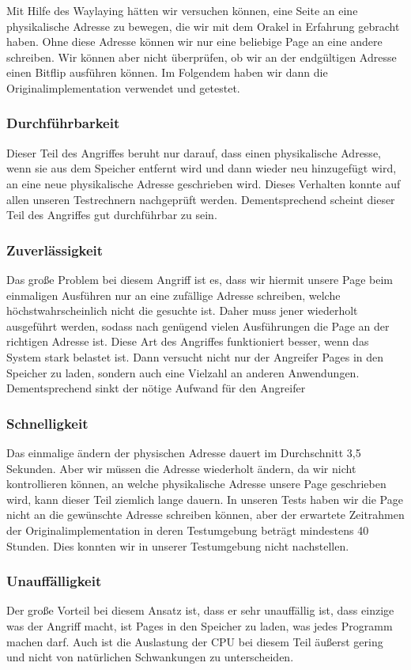 Mit Hilfe des Waylaying hätten wir versuchen können, eine Seite an eine physikalische Adresse zu bewegen, die wir mit dem Orakel in Erfahrung gebracht haben. Ohne diese Adresse können wir nur eine beliebige Page an eine andere schreiben. Wir können aber nicht überprüfen, ob wir an der endgültigen Adresse einen Bitflip ausführen können. Im Folgendem haben wir dann die Originalimplementation\cite{git-rowhammer} verwendet und getestet.

\subsubsection{Durchführbarkeit}
Dieser Teil des Angriffes beruht nur darauf, dass einen physikalische Adresse, wenn sie aus dem Speicher entfernt wird und dann wieder neu hinzugefügt wird, an eine neue physikalische Adresse geschrieben wird. Dieses Verhalten konnte auf allen unseren Testrechnern nachgeprüft werden. Dementsprechend scheint dieser Teil des Angriffes gut durchführbar zu sein.
\subsubsection{Zuverlässigkeit}
Das große Problem bei diesem Angriff ist es, dass wir hiermit unsere Page beim einmaligen Ausführen nur an eine zufällige Adresse schreiben, welche höchstwahrscheinlich nicht die gesuchte ist. Daher muss jener wiederholt ausgeführt werden, sodass nach genügend vielen Ausführungen die Page an der richtigen Adresse ist. 
Diese Art des Angriffes funktioniert besser, wenn das System stark belastet ist. Dann versucht nicht nur der Angreifer Pages in den Speicher zu laden, sondern auch eine Vielzahl an anderen Anwendungen. Dementsprechend sinkt der nötige Aufwand für den Angreifer
\subsubsection{Schnelligkeit}
Das einmalige ändern der physischen Adresse dauert im Durchschnitt 3,5 Sekunden. Aber wir müssen die Adresse wiederholt ändern, da wir nicht kontrollieren können, an welche physikalische Adresse unsere Page geschrieben wird, kann dieser Teil ziemlich lange dauern. In unseren Tests haben wir die Page nicht an die gewünschte Adresse schreiben können, aber der erwartete Zeitrahmen der Originalimplementation in deren Testumgebung beträgt mindestens 40 Stunden. Dies konnten wir in unserer Testumgebung nicht nachstellen.
\subsubsection{Unauffälligkeit}
Der große Vorteil bei diesem Ansatz ist, dass er sehr unauffällig ist, dass einzige was der Angriff macht, ist Pages in den Speicher zu laden, was jedes Programm machen darf. Auch ist die Auslastung der CPU bei diesem Teil äußerst gering und nicht von natürlichen Schwankungen zu unterscheiden.